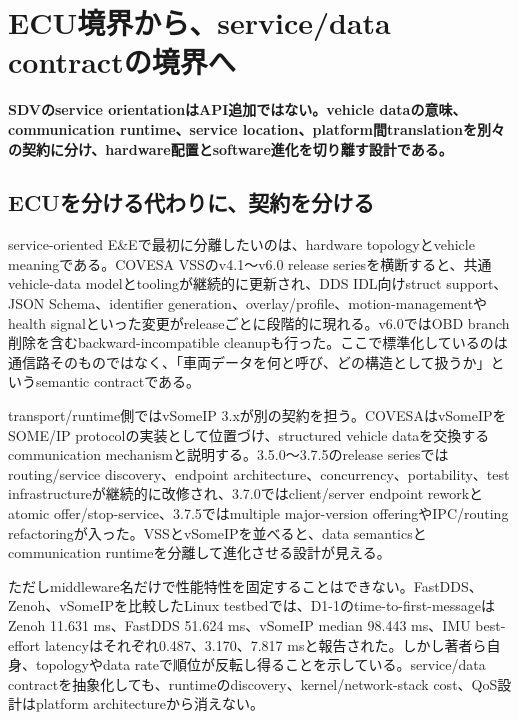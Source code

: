 \section{ECU境界から、service/data contractの境界へ}
\noindent\textbf{SDVのservice orientationはAPI追加ではない。vehicle dataの意味、communication runtime、service location、platform間translationを別々の契約に分け、hardware配置とsoftware進化を切り離す設計である。}\autocite{src-1486b9718088,src-3ce752187789,src-971a21882f71,src-c89d0f167c6b,src-db0527589c91,src-e24ad9438abe,src-e48bb52ed24d}

\begin{surveyarticlebody}
\subsection{ECUを分ける代わりに、契約を分ける}

service-oriented E\&Eで最初に分離したいのは、hardware topologyとvehicle meaningである。COVESA VSSのv4.1〜v6.0 release seriesを横断すると、共通vehicle-data modelとtoolingが継続的に更新され、DDS IDL向けstruct support、JSON Schema、identifier generation、overlay/profile、motion-managementやhealth signalといった変更がreleaseごとに段階的に現れる。v6.0ではOBD branch削除を含むbackward-incompatible cleanupも行った。ここで標準化しているのは通信路そのものではなく、「車両データを何と呼び、どの構造として扱うか」というsemantic contractである。\autocite{src-1486b9718088,src-3ce752187789,src-971a21882f71,src-c89d0f167c6b,src-e24ad9438abe}

transport/runtime側ではvSomeIP 3.xが別の契約を担う。COVESAはvSomeIPをSOME/IP protocolの実装として位置づけ、structured vehicle dataを交換するcommunication mechanismと説明する。3.5.0〜3.7.5のrelease seriesではrouting/service discovery、endpoint architecture、concurrency、portability、test infrastructureが継続的に改修され、3.7.0ではclient/server endpoint reworkとatomic offer/stop-service、3.7.5ではmultiple major-version offeringやIPC/routing refactoringが入った。VSSとvSomeIPを並べると、data semanticsとcommunication runtimeを分離して進化させる設計が見える。\autocite{src-6e8a6e979101,src-879373aaf497,src-99e7f06f7d63,src-ca972b7a2898,src-db0527589c91,src-ddf9eb5e9b75,src-f81981d5bb3b}

ただしmiddleware名だけで性能特性を固定することはできない。FastDDS、Zenoh、vSomeIPを比較したLinux testbedでは、D1-1のtime-to-first-messageはZenoh 11.631 ms、FastDDS 51.624 ms、vSomeIP median 98.443 ms、IMU best-effort latencyはそれぞれ0.487、3.170、7.817 msと報告された。しかし著者ら自身、topologyやdata rateで順位が反転し得ることを示している。service/data contractを抽象化しても、runtimeのdiscovery、kernel/network-stack cost、QoS設計はplatform architectureから消えない。\autocite{src-3679b299f3f3}


\end{surveyarticlebody}

